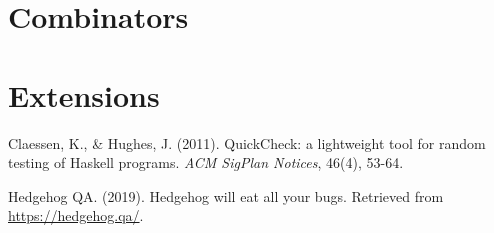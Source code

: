 \documentclass{scrartcl}
\begin{document}

\section{Combinators}


\section{Extensions}


\begin{thebibliography}{99}

Claessen, K., \& Hughes, J. (2011). QuickCheck: a lightweight tool for random
testing of Haskell programs. \textit{ACM SigPlan Notices}, 46(4), 53-64.

Hedgehog QA. (2019). Hedgehog will eat all your bugs. Retrieved from
\url{https://hedgehog.qa/}.

\end{thebibliography}
\end{document}

